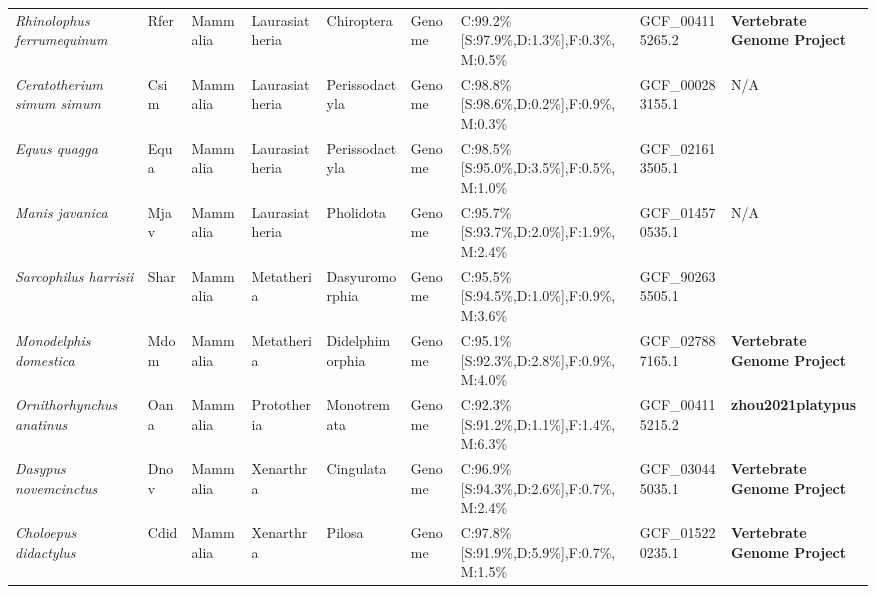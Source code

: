 \documentclass[../main.tex]{subfiles}
\begin{document}
\begin{landscape}
\begin{longtable}{lllllllll}
		\textit{Rhinolophus ferrumequinum}      & Rfer        & Mammalia       & Laurasiatheria   & Chiroptera      & Genome        & C:99.2\%{[}S:97.9\%,D:1.3\%{]},F:0.3\%,M:0.5\% & GCF\_004115265.2       & \textbf{Vertebrate Genome Project}        \\
		\textit{Ceratotherium simum simum}      & Csim        & Mammalia       & Laurasiatheria   & Perissodactyla  & Genome        & C:98.8\%{[}S:98.6\%,D:0.2\%{]},F:0.9\%,M:0.3\% & GCF\_000283155.1       & N/A                                       \\
		\textit{Equus quagga}                   & Equa        & Mammalia       & Laurasiatheria   & Perissodactyla  & Genome        & C:98.5\%{[}S:95.0\%,D:3.5\%{]},F:0.5\%,M:1.0\% & GCF\_021613505.1       & \textbf{\cite{vilstrup2013mitochondrial}} \\
		\textit{Manis javanica}                 & Mjav        & Mammalia       & Laurasiatheria   & Pholidota       & Genome        & C:95.7\%{[}S:93.7\%,D:2.0\%{]},F:1.9\%,M:2.4\% & GCF\_014570535.1       & N/A                                       \\
		\textit{Sarcophilus harrisii}           & Shar        & Mammalia       & Metatheria       & Dasyuromorphia  & Genome        & C:95.5\%{[}S:94.5\%,D:1.0\%{]},F:0.9\%,M:3.6\% & GCF\_902635505.1       & \textbf{\cite{stammnitz2023evolution}}    \\
		\textit{Monodelphis domestica}          & Mdom        & Mammalia       & Metatheria       & Didelphimorphia & Genome        & C:95.1\%{[}S:92.3\%,D:2.8\%{]},F:0.9\%,M:4.0\% & GCF\_027887165.1       & \textbf{Vertebrate Genome Project}        \\
		\textit{Ornithorhynchus anatinus}       & Oana        & Mammalia       & Prototheria      & Monotremata     & Genome        & C:92.3\%{[}S:91.2\%,D:1.1\%{]},F:1.4\%,M:6.3\% & GCF\_004115215.2       & \textbf{zhou2021platypus}                 \\
		\textit{Dasypus novemcinctus}           & Dnov        & Mammalia       & Xenarthra        & Cingulata       & Genome        & C:96.9\%{[}S:94.3\%,D:2.6\%{]},F:0.7\%,M:2.4\% & GCF\_030445035.1       & \textbf{Vertebrate Genome Project}        \\
		\textit{Choloepus didactylus}           & Cdid        & Mammalia       & Xenarthra        & Pilosa          & Genome        & C:97.8\%{[}S:91.9\%,D:5.9\%{]},F:0.7\%,M:1.5\% & GCF\_015220235.1       & \textbf{Vertebrate Genome Project}        \\* \bottomrule \bottomrule
	\end{longtable}
\end{landscape}
\end{document}
